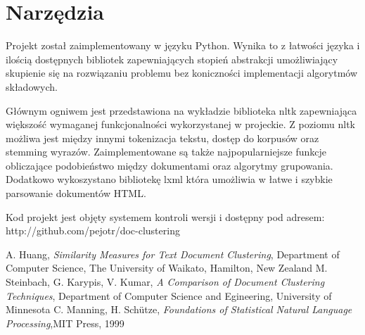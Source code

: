 \documentclass{article}
\begin{document}
\section{Narzędzia}
Projekt został zaimplementowany w języku Python. Wynika to z łatwości języka i ilością dostępnych bibliotek zapewniających stopień abstrakcji umożliwiający skupienie się na rozwiązaniu problemu bez koniczności implementacji algorytmów składowych.

Głównym ogniwem jest przedstawiona na wykładzie biblioteka nltk zapewniająca większość wymaganej funkcjonalności wykorzystanej w projeckie. Z poziomu nltk możliwa jest między innymi tokenizacja tekstu, dostęp do korpusów oraz stemming wyrazów. Zaimplementowane są także najpopularniejsze funkcje obliczające podobieństwo między dokumentami oraz algorytmy grupowania. Dodatkowo wykoszystano bibliotekę lxml która umożliwia w łatwe i szybkie parsowanie dokumentów HTML.

Kod projekt jest objęty systemem kontroli wersji i dostępny pod adresem: http://github.com/pejotr/doc-clustering

\begin{thebibliography}{9}
A. Huang, \emph{Similarity Measures for Text Document Clustering}, Department of Computer Science, The University of Waikato, Hamilton, New Zealand
M. Steinbach, G. Karypis, V. Kumar, \emph{A Comparison of Document Clustering Techniques}, Department of Computer Science and Egineering, University of Minnesota
C. Manning, H. Schütze, \emph{Foundations of Statistical Natural Language Processing},MIT Press, 1999
\end{thebibliography}
\end{document}
